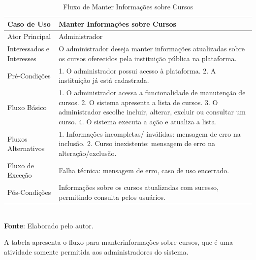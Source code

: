 \begin{table}[h!]
\centering
\caption{Fluxo de Manter Informações sobre Cursos}
\begin{tabular}{|m{4cm}|m{11cm}|}
\hline
\textbf{Caso de Uso}   & \textbf{Manter Informações sobre Cursos} \\
\hline
Ator Principal & Administrador\\
\hline
Interessados e Interesses & O administrador deseja manter informações atualizadas sobre os cursos oferecidos pela instituição pública na plataforma. \\
\hline
Pré-Condições & 

1. O administrador possui acesso à plataforma.
2. A instituição já está cadastrada. \\
\hline
Fluxo Básico & 
1. O administrador acessa a funcionalidade de manutenção de cursos.
2. O sistema apresenta a lista de cursos.
3. O administrador escolhe incluir, alterar, excluir ou consultar um curso.
4. O sistema executa a ação e atualiza a lista.
\\
\hline
Fluxos Alternativos & 

1. Informações incompletas/ inválidas: mensagem de erro na inclusão.
2. Curso inexistente: mensagem de erro na alteração/exclusão.
\\
\hline
Fluxo de Exceção & Falha técnica: mensagem de erro, caso de uso encerrado. \\
\hline
Pós-Condições & Informações sobre os cursos atualizadas com sucesso, permitindo consulta pelos usuários.\\
\hline
\end{tabular}
\label{table:casos-de-uso}
\\[1ex]
\footnotesize \textbf{Fonte}: Elaborado pelo autor.
\end{table}

A tabela apresenta o fluxo para manterinformações sobre cursos, que é uma atividade somente permitida aos administradores do sistema.
\newpage

